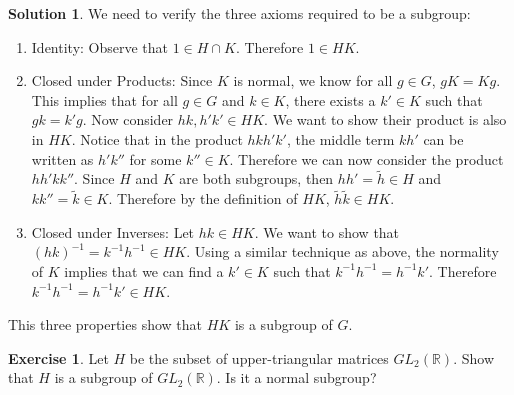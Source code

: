 \documentclass[12pt]{article}
\theoremstyle{definition}
\newcommand{\R}{\mathbb{R}}
\newtheorem{exercise}{\color{YellowOrange}Exercise}
\theoremstyle{definition}
\newtheorem{solution}{\color{Goldenrod}Solution}
\begin{document}
\begin{solution}
We need to verify the three axioms required to be a subgroup:
\begin{enumerate}
	\item Identity: Observe that $1 \in H \cap K$. Therefore $1 \in HK$.
	\item Closed under Products: Since $K$ is normal, we know for all $g \in G$, $gK = Kg$. This implies that for all $g \in G$ and $k \in K$, there exists a $k' \in K$ such that $gk = k'g$. Now consider $hk, h'k' \in HK$. We want to show their product is also in $HK$. Notice that in the product $hkh'k'$, the middle term $kh'$ can be written as $h'k''$ for some $k'' \in K$. Therefore we can now consider the product $hh'kk''$. Since $H$ and $K$ are both subgroups, then $hh'=\tilde{h} \in H$ and $kk'' = \tilde{k} \in K$. Therefore by the definition of $HK$, $\tilde{h}\tilde{k} \in HK$. 
	\item Closed under Inverses: Let $hk \in HK$. We want to show that $(hk)^{-1} = k^{-1} h^{-1} \in HK$. Using a similar technique as above, the normality of $K$ implies that we can find a $k' \in K$ such that $k^{-1} h^{-1} = h^{-1} k'$. Therefore $k^{-1} h^{-1} = h^{-1} k' \in HK$.
\end{enumerate}
This three properties show that $HK$ is a subgroup of $G$.
\end{solution}

\begin{exercise}
Let $H$ be the subset of upper-triangular matrices $GL_2(\R)$. Show that $H$ is a subgroup of $GL_2(\R)$. Is it a normal subgroup?
\end{exercise}
\end{document}
